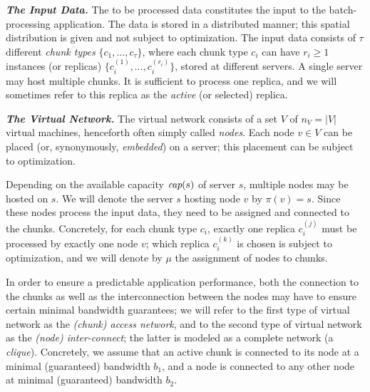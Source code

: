 \documentclass[9pt]{sigcomm-alternate}
\newcommand{\MaFactor}{m}
\newcommand{\ChunkType}{\tau}
\newcommand{\VirtualNodes}{\ensuremath{V}}
\newcommand{\achunk}{\ensuremath{c}}
\newcommand{\capacity}{\emph{cap}}
\newcommand{\CostTrans}{\ensuremath{b_1}}
\newcommand{\CostCom}{\ensuremath{b_2}}
\begin{document}
\textbf{\emph{The Input Data.}} The to be processed data constitutes the input to the batch-processing application.
The data is stored in a distributed manner; this spatial distribution is given and not subject to optimization.
The input data consists of $\tau$ different \emph{chunk types} $\{\achunk_1, \ldots, \achunk_{\ChunkType}\}$,
where each chunk type $\achunk_i$ can have $r_i\geq 1$ instances (or replicas) $\{\achunk_{i}^{(1)},\ldots, \achunk_{i}^{(r_i)}\}$,
 stored at different servers. A single server may host multiple chunks.
It is sufficient to process one replica, and we will sometimes refer to this
replica as the \emph{active} (or selected) replica.

\textbf{\emph{The Virtual Network.}} The virtual network consists of a set $\VirtualNodes$ of $n_V=|\VirtualNodes|$ virtual machines,
henceforth often simply called \emph{nodes}.
Each node $v \in \VirtualNodes$ can be placed (or, synonymously, \emph{embedded}) on a server; this placement can be subject
to optimization.

Depending on the available capacity $\capacity(s)$ of server $s$, multiple nodes may be hosted on $s$.
We will denote the server $s$ hosting node $v$ by $\pi(v)=s$.
Since these nodes process the input data, they need to be assigned and connected to the
chunks. Concretely, for each chunk type $\achunk_i$, exactly one
replica $\achunk_{i}^{(j)}$ must be processed by exactly one node $v$;
which replica $\achunk_{i}^{(k)}$ is chosen is subject to optimization, and
we will denote by $\mu$ the assignment of nodes to chunks.

In order to ensure a predictable application performance, both the connection to the chunks
as well as the interconnection between the nodes may have to ensure certain
minimal bandwidth guarantees; we will refer to the first type of virtual network as the \emph{(chunk) access
network}, and to the second type of virtual network as the \emph{(node) inter-connect}; the latter
is modeled as a complete network (a \emph{clique}). Concretely, we assume that an  active chunk
is connected to its node at a minimal (guaranteed) bandwidth $\CostTrans$, and a node is connected to any other node
at minimal (guaranteed) bandwidth $\CostCom$.
\end{document}
